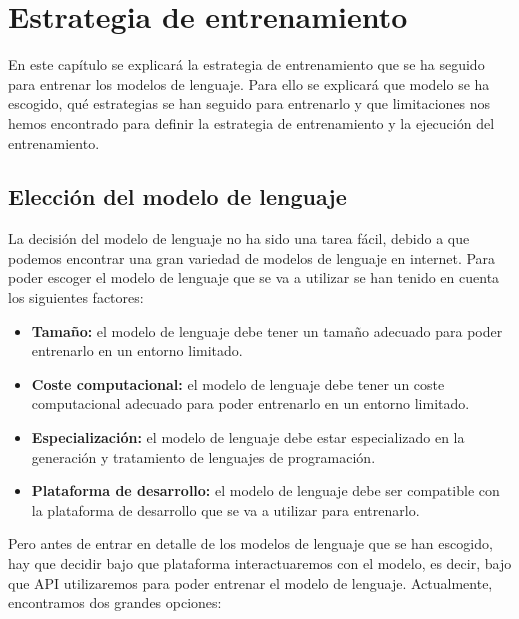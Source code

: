 \chapter{Estrategia de entrenamiento}
\label{cap:estrategia_entrenamiento}


En este capítulo se explicará la estrategia de entrenamiento que se ha seguido para
entrenar los modelos de lenguaje. Para ello se explicará que modelo se ha escogido,
qué estrategias se han seguido para entrenarlo y que limitaciones nos hemos encontrado
para definir la estrategia de entrenamiento y la ejecución del entrenamiento.

\section{Elección del modelo de lenguaje}
\label{sec:modelo_lenguaje}


La decisión del modelo de lenguaje no ha sido una tarea fácil, debido a que podemos
encontrar una gran variedad de modelos de lenguaje en internet. Para poder escoger
el modelo de lenguaje que se va a utilizar se han tenido en cuenta los siguientes
factores:

\begin{itemize}
    \item \textbf{Tamaño:} el modelo de lenguaje debe tener un tamaño adecuado
        para poder entrenarlo en un entorno limitado.
    \item \textbf{Coste computacional:} el modelo de lenguaje debe tener un coste
        computacional adecuado para poder entrenarlo en un entorno limitado.
    \item \textbf{Especialización:} el modelo de lenguaje debe estar especializado
        en la generación y tratamiento de lenguajes de programación.
    \item \textbf{Plataforma de desarrollo:} el modelo de lenguaje debe ser compatible
        con la plataforma de desarrollo que se va a utilizar para entrenarlo.
\end{itemize}

Pero antes de entrar en detalle de los modelos de lenguaje que se han escogido,
hay que decidir bajo que plataforma interactuaremos con el modelo, es decir, bajo
que API utilizaremos para poder entrenar el modelo de lenguaje. Actualmente, encontramos
dos grandes opciones:

